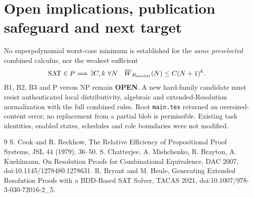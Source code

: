 \documentclass[11pt]{article}
\begin{document}
\section*{Open implications, publication safeguard and next target}
No superpolynomial worst-case minimum is established for the \emph{same preselected} combined calculus, nor the weakest sufficient
\[
\mathrm{SAT}\in P\Longrightarrow
\exists C,k\ \forall N\quad
\overline W_{R_{\rm mix341}}(N)\le C(N+1)^k.
\]
B1, B2, B3 and P versus NP remain \textbf{OPEN}. A new hard-family candidate must resist authenticated local distributivity, algebraic and extended-Resolution normalization with the full combined rules. Root \texttt{main.tex} returned an oversized-content error; no replacement from a partial blob is permissible. Existing task identities, enabled states, schedules and role boundaries were not modified.

\begin{thebibliography}{9}
 S. Cook and R. Reckhow, The Relative Efficiency of Propositional Proof Systems, JSL 44 (1979), 36--50.
 S. Chatterjee, A. Mishchenko, R. Brayton, A. Kuehlmann, On Resolution Proofs for Combinational Equivalence, DAC 2007, doi:10.1145/1278480.1278631.
 R. Bryant and M. Heule, Generating Extended Resolution Proofs with a BDD-Based SAT Solver, TACAS 2021, doi:10.1007/978-3-030-72016-2\_5.
\end{thebibliography}
\end{document}
